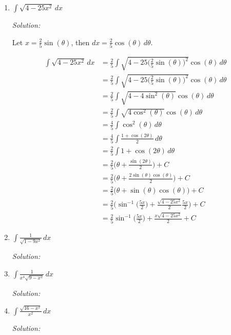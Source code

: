 \documentclass[16pt]{article}
\theoremstyle{remark}
\begin{document}
\begin{enumerate}

\item $\displaystyle{\int \sqrt{4-25x^2}\, dx}$
\begin{mdframed}[style=TheoremFrame]
\textit{Solution:}

\begin{center}
Let $\displaystyle{x = \frac{2}{5}\sin(\theta) }$, then $\displaystyle{ dx = \frac{2}{5}\cos(\theta) \, d\theta }$.
\end{center}
\begin{align*}
\int \sqrt{4-25x^2}\, dx &= \frac{2}{5}\int \sqrt{4 - 25\bigg(\frac{2}{5} \sin(\theta)\bigg)^2} \cos(\theta) \, d\theta\\[2ex]
&= \frac{2}{5}\int \sqrt{4 - 25\bigg(\frac{2}{5} \sin(\theta)\bigg)^2} \cos(\theta) \, d\theta\\[2ex]
&= \frac{2}{5}\int \sqrt{4 - 4 \sin^2(\theta)} \cos(\theta) \, d\theta\\[2ex]
&= \frac{2}{5}\int \sqrt{4 \cos^2(\theta)} \cos(\theta) \, d\theta\\[2ex]
&= \frac{4}{5}\int \cos^2(\theta) \, d\theta\\[2ex]
&= \frac{4}{5}\int \frac{1+\cos(2\theta)}{2} \, d\theta\\[2ex]
&= \frac{2}{5}\int 1+\cos(2\theta) \, d\theta\\[2ex]
&= \frac{2}{5}\bigg( \theta +\frac{\sin(2\theta)}{2} \bigg) +C\\[2ex]
&= \frac{2}{5}\bigg( \theta +\frac{2\sin(\theta)\cos(\theta)}{2} \bigg) +C\\[2ex]
&= \frac{2}{5}\bigg( \theta +\sin(\theta)\cos(\theta) \bigg) +C\\[2ex]
&= \frac{2}{5}\bigg( \sin^{-1}\bigg(\frac{5x}{2}\bigg) +\frac{\sqrt{4-25x^2}}{2}\frac{5x}{2}\bigg)+C\\[2ex]
&= \frac{2}{5} \sin^{-1}\bigg(\frac{5x}{2}\bigg) +\frac{x\sqrt{4-25x^2}}{2}+C
\end{align*}
\end{mdframed}
\newpage
\item $\displaystyle{\int \frac{1}{\sqrt{1-9x^2}} \, dx}$
\begin{mdframed}[style=TheoremFrame]
\textit{Solution:}

\end{mdframed}
\newpage
\item $\displaystyle{\int \frac{1}{x^4\sqrt{9-x^2}}\, dx}$
\begin{mdframed}[style=TheoremFrame]
\textit{Solution:}

\end{mdframed}
\newpage
\item $\displaystyle{\int \frac{\sqrt{16-x^2}}{x^2} \,dx}$
\begin{mdframed}[style=TheoremFrame]
\textit{Solution:}

\end{mdframed}
\newpage

\end{enumerate}
\end{document}
